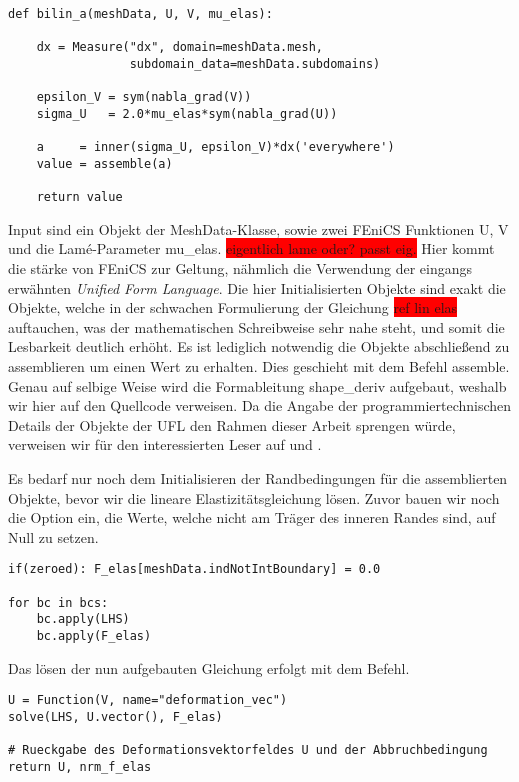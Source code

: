 \documentclass[bibliography=totoc,12pt,a4paper]{scrartcl}
\theoremstyle{exampstyle}
\numberwithin{equation}{section}
\begin{document}
\begin{lstlisting}
def bilin_a(meshData, U, V, mu_elas):

    dx = Measure("dx", domain=meshData.mesh, 
                 subdomain_data=meshData.subdomains)

    epsilon_V = sym(nabla_grad(V))
    sigma_U   = 2.0*mu_elas*sym(nabla_grad(U))

    a     = inner(sigma_U, epsilon_V)*dx('everywhere')
    value = assemble(a)

    return value

\end{lstlisting}
Input sind ein Objekt der \textsf{MeshData}-Klasse, sowie zwei FEniCS Funktionen \textsf{U, V} und die Lamé-Parameter \textsf{mu\_elas}. \colorbox{red}{eigentlich lame oder? passt eig.} Hier kommt die stärke von FEniCS zur Geltung, nähmlich die Verwendung der eingangs erwähnten \textit{Unified Form Language}. Die hier Initialisierten Objekte sind exakt die Objekte, welche in der schwachen Formulierung der Gleichung \colorbox{red}{ref lin elas} auftauchen, was der mathematischen Schreibweise sehr nahe steht, und somit die Lesbarkeit deutlich erhöht. Es ist lediglich notwendig die Objekte abschließend zu assemblieren um einen Wert zu erhalten. Dies geschieht mit dem Befehl \textsf{assemble}. Genau auf selbige Weise wird die Formableitung \textsf{shape\_deriv} aufgebaut, weshalb wir hier auf den Quellcode verweisen. Da die Angabe der programmiertechnischen Details der Objekte der UFL den Rahmen dieser Arbeit sprengen würde, verweisen wir für den interessierten Leser auf \cite{fenics} und \cite{Unifiedformlanguage}.

Es bedarf nur noch dem Initialisieren der Randbedingungen für die assemblierten Objekte, bevor wir die lineare Elastizitätsgleichung lösen. Zuvor bauen wir noch die Option ein, die Werte, welche nicht am Träger des inneren Randes sind, auf Null zu setzen.

\begin{lstlisting}
if(zeroed): F_elas[meshData.indNotIntBoundary] = 0.0

for bc in bcs:
    bc.apply(LHS)
    bc.apply(F_elas)
\end{lstlisting}

Das lösen der nun aufgebauten Gleichung erfolgt mit dem Befehl.
\begin{lstlisting}
U = Function(V, name="deformation_vec")
solve(LHS, U.vector(), F_elas)

# Rueckgabe des Deformationsvektorfeldes U und der Abbruchbedingung
return U, nrm_f_elas

\end{lstlisting}
\end{document}
